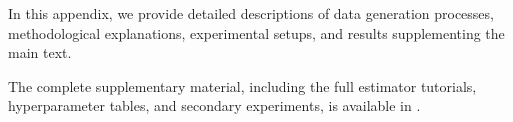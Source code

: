 
In this appendix, we provide detailed descriptions of data generation processes, methodological explanations, experimental setups, and results supplementing the main text.

The complete supplementary material, including the full estimator tutorials, hyperparameter tables, and secondary experiments, is available in \citet[Appendices A--I]{noroozizadeh2026survhte}.

